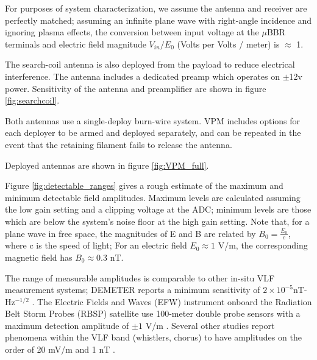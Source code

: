 For purposes of system characterization, we assume the antenna and receiver are perfectly matched; assuming an infinite plane wave with right-angle incidence and ignoring plasma effects, the conversion between input voltage at the $\mu$BBR terminals and electric field magnitude $V_{in}/E_0$ (Volts per Volts / meter) is $\approx$ 1.

The search-coil antenna is also deployed from the payload to reduce electrical interference. The antenna includes a dedicated preamp which operates on $\pm$12v power. Sensitivity of the antenna and preamplifier are shown in figure \ref{fig:searchcoil}.

Both antennas use a single-deploy burn-wire system. VPM includes options for each deployer to be armed and deployed separately, and can be repeated in the event that the retaining filament fails to release the antenna.

Deployed antennas are shown in figure \ref{fig:VPM_full}.

Figure \ref{fig:detectable_ranges} gives a rough estimate of the maximum and minimum detectable field amplitudes. Maximum levels are calculated assuming the low gain setting and a clipping voltage at the ADC; minimum levels are those which are below the system's noise floor at the high gain setting. Note that, for a plane wave in free space, the magnitudes of E and B are related by $B_0 = \frac{E_0}{c}$, where c is the speed of light; For an electric field $E_0 \approx 1$ V/m, the corresponding magnetic field has $B_0 \approx 0.3$ nT.

The range of measurable amplitudes is comparable to other in-situ VLF measurement systems; DEMETER reports a minimum sensitivity of $2\times10^{-5}$nT-Hz$^{-1/2}$ \citep{Cussac2006}. The Electric Fields and Waves (EFW) instrument onboard the Radiation Belt Storm Probes (RBSP) satellite use 100-meter double probe sensors with a maximum detection amplitude of $\pm 1$ V/m \citep{Wygant2014}. Several other studies report phenomena within the VLF band (whistlers, chorus) to have amplitudes on the order of 20 mV/m and 1 nT \citep{Wygant2014, Cattell2015, Bhattacharya2009}.



